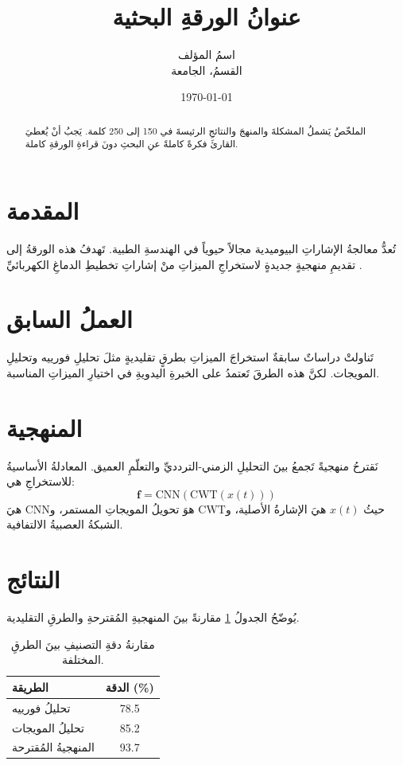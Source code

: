 \documentclass[12pt, a4paper]{article}
\title{عنوانُ الورقةِ البحثية}
\author{اسمُ المؤلف \\
القسمُ، الجامعة \\
\LR{author@university.edu}}
\date{\today}
\begin{document}
\maketitle

\begin{abstract}
الملخّصُ يَشملُ المشكلةَ والمنهجَ والنتائجِ الرئيسةَ في 150 إلى 250 كلمة.
يَجبُ أنْ يُعطيَ القارئَ فكرةً كاملةً عنِ البحثِ دونَ قراءةِ الورقةِ كاملة.
\end{abstract}

\section{المقدمة}
تُعدُّ معالجةُ الإشاراتِ البيوميدية\LR{} مجالاً حيوياً في الهندسةِ الطبية.
تَهدفُ هذه الورقةُ إلى تقديمِ منهجيةٍ جديدةٍ لاستخراجِ الميزاتِ منْ إشاراتِ
تخطيطِ الدماغِ الكهربائيِّ .

\section{العملُ السابق}
تَناولتْ دراساتٌ سابقةٌ استخراجَ الميزاتِ بطرقٍ تقليديةٍ مثلَ تحليلِ
فورييه وتحليلِ المويجات. لكنَّ هذه الطرقَ تَعتمدُ على الخبرةِ اليدويةِ في
اختيارِ الميزاتِ المناسبة.

\section{المنهجية}
نَقترحُ منهجيةً تَجمعُ بينَ التحليلِ الزمني-التردديِّ والتعلّمِ العميق.
المعادلةُ الأساسيةُ للاستخراجِ هي:
\begin{equation}
\mathbf{f} = \text{CNN}(\text{CWT}(x(t)))
\end{equation}
حيثُ \(x(t)\) هيَ الإشارةُ الأصلية، و\(\text{CWT}\) هوَ تحويلُ المويجاتِ
المستمر، و\(\text{CNN}\) هيَ الشبكةُ العصبيةُ الالتفافية.

\section{النتائج}
يُوضّحُ الجدولُ \ref{tab:results} مقارنةً بينَ المنهجيةِ المُقترحةِ والطرقِ التقليدية.

\begin{table}[htbp]
\caption{مقارنةُ دقةِ التصنيفِ بينَ الطرقِ المختلفة.}
\label{tab:results}
\centering
\begin{tabular}{lc}
\toprule
\textbf{الطريقة} & \textbf{الدقة (\%)} \\
\midrule
تحليلُ فورييه & 78.5 \\
تحليلُ المويجات & 85.2 \\
المنهجيةُ المُقترحة & 93.7 \\
\bottomrule
\end{tabular}
\end{table}
\end{document}
